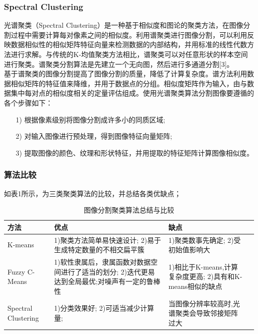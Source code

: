\documentclass[conference]{IEEEtran}
\begin{document}
\subsubsection{Spectral Clustering}
光谱聚类（Spectral Clustering）是一种基于相似度和图论的聚类方法，在图像分割过程中需要计算每对像素之间的相似度。利用谱聚类进行图像分割，可以利用反映数据相似性的相似矩阵特征向量来检测数据的内部结构，并用标准的线性代数方法进行求解。与传统的K-均值聚类方法相比，谱聚类可以对任意形状的样本空间进行聚类。谱聚类分割算法是先建立一个无向图，然后进行多通道分割[3]。\\
基于谱聚类的图像分割提高了图像分割的质量，降低了计算复杂度。谱方法利用数据相似矩阵的特征值来降维，并用于数据点的分组。相似度矩阵作为输入，由与数据集中每对点的相似度相关的定量评估组成。使用光谱聚类算法分割图像要遵循的各个步骤如下：
\begin{itemize}
\item[1)]根据像素级别将图像分割成许多小的同质区域;
\item[2)]对输入图像进行预处理，得到图像特征向量矩阵;
\item[3)]提取图像的颜色、纹理和形状特征，并用提取的特征矩阵计算图像相似度。
\end{itemize}
\subsubsection{算法比较}
如表1所示，为三类聚类算法的比较，并总结各类优缺点；
\begin{table}[h]
\begin{threeparttable}
\label{Tab:1}
\caption{图像分割聚类算法总结与比较}
\centering
\begin{tabular}{lp{3cm}p{3cm}p{3cm}}
\toprule
 \textbf{方法} & \textbf{优点} & \textbf{缺点}\\
\midrule
   K-means & 1)聚类方法简单易快速设计; 2)易于生成特定数量的不相交扁平簇
   & 1)聚类数事先确定; 2)受初始值影响大 \\ \hline
\addlinespace
   Fuzzy C-Means
   & 1)软性隶属后，隶属函数对数据空间进行了适当的划分;
   2)迭代更易达到全局最优;对噪声有一定的鲁棒性
   & 1)相比于K-means,计算复杂度更高; 2)具有和K-means相似的缺点  \\ 
   \hline
\addlinespace
   Spectral Clustering
   & 1)分类效果好; 2)可适当减少计算量;
   & 当图像分辨率较高时,光谱聚类会导致邻接矩阵过大\\
   \hline
  
\bottomrule

\end{tabular}
\end{threeparttable}
\end{table}
\end{document}
